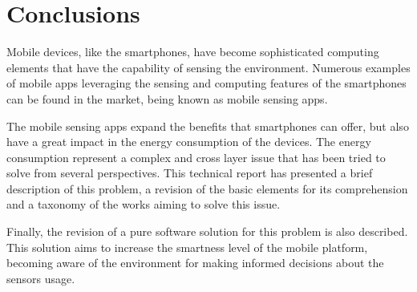 \section{Conclusions}
Mobile devices, like the smartphones, have become sophisticated computing elements that have the capability of sensing the environment. 
Numerous examples of mobile apps leveraging the sensing and computing features of the smartphones can be found in the market, being known as mobile sensing apps.

The mobile sensing apps expand the benefits that smartphones can offer, but also have a great impact in the energy consumption of the devices.
The energy consumption represent a complex and cross layer issue that has been tried to solve from several perspectives.
This technical report has presented a brief description of this problem, a revision of the basic elements for its comprehension and a taxonomy of the works aiming to solve this issue.

Finally, the revision of a pure software solution for this problem is also described.
This solution aims to increase the smartness level of the mobile platform, becoming aware of the environment for making informed decisions about the sensors usage.
